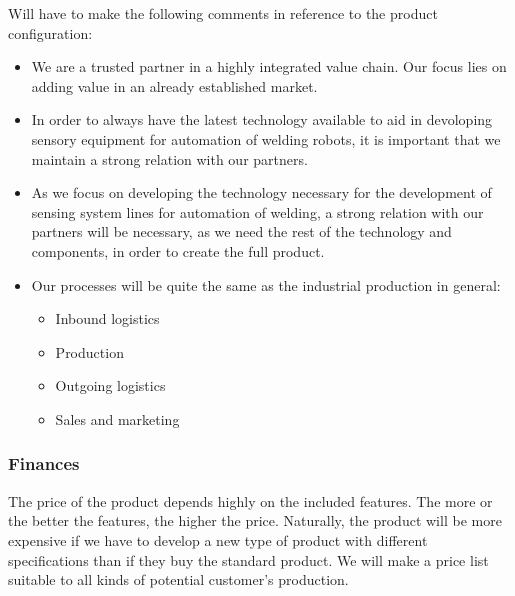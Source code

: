 Will have to make the following comments in reference to the product configuration:

\begin{itemize}
\item We are a trusted partner in a highly integrated value chain. Our focus lies on adding value in an already established market.
\item {} In order to always have the latest technology available to aid in devoloping sensory equipment for automation of welding robots, it is important that we maintain a strong relation with our partners.
\item As we focus on developing the technology necessary for the development of sensing system lines for automation of welding, a strong relation with our partners will be necessary, as we need the rest of the technology and components, in order to create the full product.
\item Our processes will be quite the same as the industrial production in general:
\begin{itemize}
\item Inbound logistics
\item Production
\item Outgoing logistics
\item Sales and marketing
\end{itemize}
\end{itemize}

\subsubsection{Finances} 
The price of the product depends highly on the included features. 
The more or the better the features, the higher the price. Naturally, the product will be more expensive if we have to develop a new type of product with different specifications than if they buy the standard product. We will make a price list suitable to all kinds of potential customer's production.
